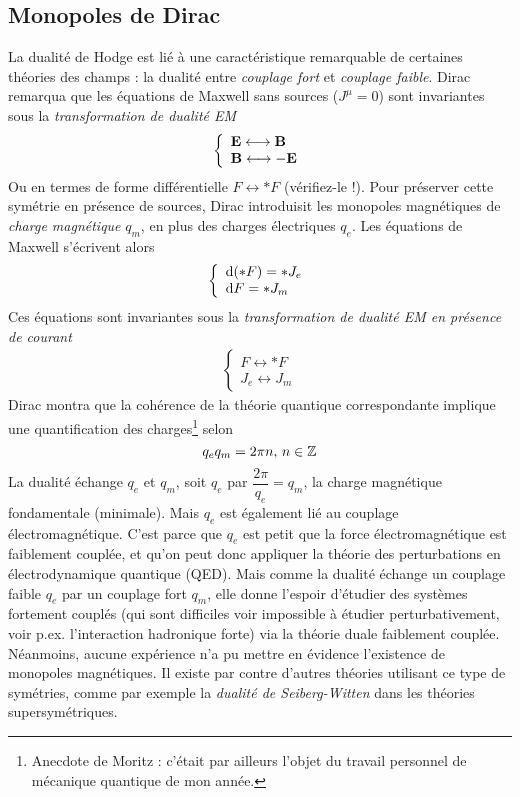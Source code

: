 \subsection{Monopoles de Dirac}
La dualité de Hodge est lié à une caractéristique remarquable de certaines théories des champs : la dualité entre \emph{couplage fort} et \emph{couplage faible}. Dirac remarqua que les équations de Maxwell sans sources ($J^\mu =0$) sont invariantes sous la \emph{transformation de dualité EM}
\begin{align}
    \left\{ 
    \begin{array}{l}
        \bm{\mathrm{E}} \longleftrightarrow \bm{\mathrm{B}} \\
        \bm{\mathrm{B}} \longleftrightarrow - \bm{\mathrm{E}}
    \end{array}
    \right.
\end{align}
Ou en termes de forme différentielle $F \longleftrightarrow *F$ (vérifiez-le !). Pour préserver cette symétrie en présence de sources, Dirac introduisit les monopoles magnétiques de \emph{charge magnétique} $q_m$, en plus des charges électriques $q_e$. Les équations de Maxwell s'écrivent alors
\begin{align}
\label{eq:Maxwell Dirac monopoles}
    \left\{
\begin{array}{l}
\mathrm{d} (*F) = *J_e\\
\mathrm{d} F = *J_m
\end{array}
\right.
\end{align}
Ces équations sont invariantes sous la \emph{transformation de dualité EM en présence de courant}
\begin{align}
    \left\{ 
    \begin{array}{l}
        F \longleftrightarrow *F \\
        J_e \longleftrightarrow J_m
    \end{array}
    \right.
\end{align}
Dirac montra que la cohérence de la théorie quantique correspondante implique une quantification des charges\footnote{Anecdote de Moritz : c'était par ailleurs l'objet du travail personnel de mécanique quantique de mon année.} selon
\begin{equation}
    q_e q_m = 2 \pi n, \, n\in \mathbb{Z}
\end{equation}
La dualité échange $q_e$ et $q_m$, soit $q_e$ par $\dfrac{2\pi}{q_e} = q_m$, la charge magnétique fondamentale (minimale). Mais $q_e$ est également lié au couplage électromagnétique. C'est parce que $q_e$ est petit que la force électromagnétique est faiblement couplée, et qu'on peut donc appliquer la théorie des perturbations en électrodynamique quantique (QED). Mais comme la dualité échange un couplage faible $q_e$ par un couplage fort $q_m$, elle donne l'espoir d'étudier des systèmes fortement couplés (qui sont difficiles voir impossible à étudier perturbativement, voir p.ex. l'interaction hadronique forte) via la théorie duale faiblement couplée. Néanmoins, aucune expérience n'a pu mettre en évidence l'existence de monopoles magnétiques. Il existe par contre d'autres théories utilisant ce type de symétries, comme par exemple la \emph{dualité de Seiberg-Witten} dans les théories supersymétriques.

